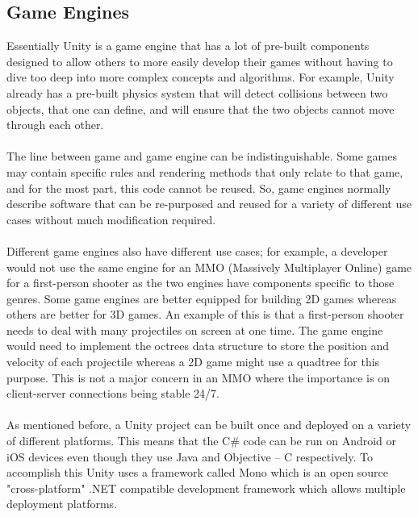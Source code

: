 \documentclass[a4paper]{report}
\begin{document}
\subsection{Game Engines}
Essentially Unity is a game engine that has a lot of pre-built components designed to allow others to more easily develop their games without having to dive too deep into more complex concepts and algorithms. For example, Unity already has a pre-built physics system that will detect collisions between two objects, that one can define, and will ensure that the two objects cannot move through each other.  
\\\\
The line between game and game engine can be indistinguishable. Some games may contain specific rules and rendering methods that only relate to that game, and for the most part, this code cannot be reused. So, game engines normally describe software that can be re-purposed and reused for a variety of different use cases without much modification required. \cite{GA}
\\\\
Different game engines also have different use cases; for example, a developer would not use the same engine for an MMO (Massively Multiplayer Online) game for a first-person shooter as the two engines have components specific to those genres. Some game engines are better equipped for building 2D games whereas others are better for 3D games. An example of this is that a first-person shooter needs to deal with many projectiles on screen at one time. The game engine would need to implement the octrees data structure to store the position and velocity of each projectile whereas a 2D game might use a quadtree for this purpose. This is not a major concern in an MMO where the importance is on client-server connections being stable 24/7. \cite{GA}
\\\\
As mentioned before, a Unity project can be built once and deployed on a variety of different platforms. This means that the C\# code can be run on Android or iOS devices even though they use Java and Objective – C respectively. To accomplish this Unity uses a framework called Mono which is an open source "cross-platform" .NET compatible development framework which allows multiple deployment platforms. \cite{Mono}
\pagebreak
\end{document}
